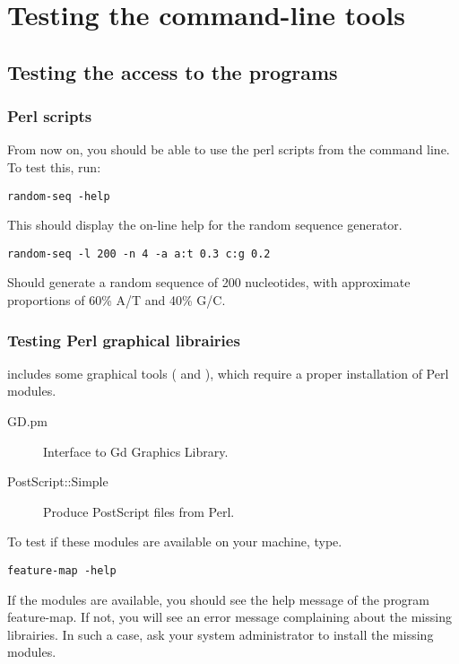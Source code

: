 \chapter{Testing the command-line tools}

\section{Testing the access to the programs}

\subsection{Perl scripts}

From now on, you should be able to use the perl scripts from the
command line. To test this, run:

\begin{lstlisting}
random-seq -help
\end{lstlisting}


This should display the on-line help for the random sequence
generator.

\begin{lstlisting}
random-seq -l 200 -n 4 -a a:t 0.3 c:g 0.2
\end{lstlisting}

Should generate a random sequence of 200 nucleotides, with approximate
proportions of 60\% A/T and 40\% G/C.


\subsection{Testing Perl graphical librairies}

\RSAT includes some graphical tools ( and
), which require a proper installation of Perl
modules.

\begin{description}
\item[GD.pm] Interface to Gd Graphics Library.
\item[PostScript::Simple]  Produce PostScript files from Perl.
\end{description}

To test if these modules are available on your machine, type.

\begin{lstlisting}
feature-map -help
\end{lstlisting}

If the modules are available, you should see the help message of the
program feature-map. If not, you will see an error message complaining
about the missing librairies. In such a case, ask your system
administrator to install the missing modules.


